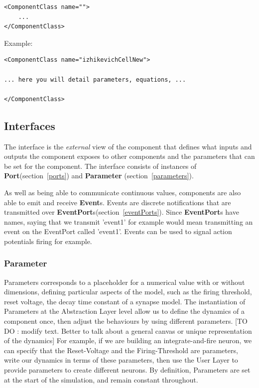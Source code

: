 \documentclass{article}
\newcommand{\EventPorts}{{\bf{EventPort}}s\xspace}
\newcommand{\Port}{{\bf{Port}}\xspace}
\newcommand{\Events}{{\bf{Event}}s\xspace}
\newcommand{\Parameter}{{\bf{Parameter}}\xspace}
\begin{document}
\begin{lstlisting}[frame=none, backgroundcolor=\color{light-gray}]
<ComponentClass name="">
	...
</ComponentClass>
\end{lstlisting}

Example: 
\begin{lstlisting}[frame=none, backgroundcolor=\color{light-gray}]
<ComponentClass name="izhikevichCellNew">

... here you will detail parameters, equations, ...

</ComponentClass>
\end{lstlisting}

\subsection{Interfaces}

The interface is the \emph{external} view of the component that defines
what inputs and outputs the component exposes to other components and the
parameters that can be set for the component. The interface consists of
instances of \Port (section~\ref{ports}) and \Parameter
(section~\ref{parameters}).

As well as being able to communicate continuous values, components are also
able to emit and receive \Events. Events are discrete notifications
that are transmitted over \EventPorts (section~\ref{eventPorts}). Since
\EventPorts have names, saying that we transmit 'event1' for example
would mean transmitting an event on the EventPort called 'event1'. Events
can be used to signal action potentials firing for example.

\subsubsection{Parameter}

Parameters corresponds to a placeholder for a numerical value with or without dimensions, defining particular aspects of the model, such as the firing threshold, reset voltage, the decay time constant of a synapse model.
The instantiation of Parameters at the Abstraction Layer level allow us to define the dynamics of a component once, then adjust the behaviours by using different parameters.  [TO DO : modify text. Better to talk about a general canvas or unique representation of the dynamics]
For example, if we are building an integrate-and-fire neuron, we can specify that the
Reset-Voltage and the Firing-Threshold are parameters, write our
dynamics in terms of these parameters, then use the User Layer to
provide parameters to create different neurons. By definition, Parameters are set at
the start of the simulation, and remain constant throughout.
\end{document}
